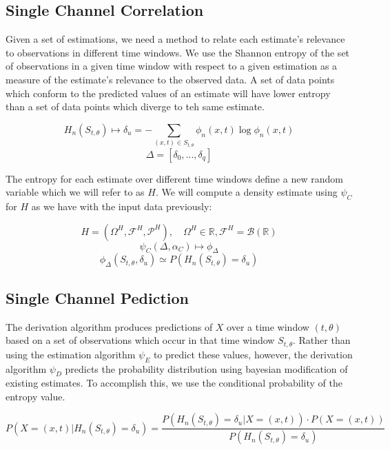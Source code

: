 \documentclass[10pt]{article}
\begin{document}
\subsection{Single Channel Correlation}

Given a set of estimations, we need a method to relate each estimate's relevance to observations in different time windows.  We use the Shannon entropy of the set of observations in a given time window with respect to a given estimation as a measure of the estimate's relevance to the observed data.  A set of data points which conform to the predicted values of an estimate will have lower entropy than a set of data points which diverge to teh same estimate.

\begin{equation} H_n( S_{t,\theta} ) \mapsto \delta_u = -\sum_{(x,t) \in S_{t,\theta}} \phi_n(x,t) \log \phi_n(x,t) \end{equation}
\[ \Delta = [\delta_0,...,\delta_q] \]

The entropy for each estimate over different time windows define a new random variable which we will refer to as \( H \).  We will compute a density estimate using \(\psi_C \) for \( H \) as we have with the input data previously:

\[ H = ( \Omega^H, \mathcal{F}^H, \mathcal{P}^H ), \quad \Omega^H \in \mathbb{R}, \mathcal{F}^H = \mathcal{B}(\mathbb{R}) \]
\begin{equation} \psi_C( \Delta , \alpha_C ) \mapsto \phi_\Delta \end{equation}
\begin{equation} \phi_\Delta(S_{t,\theta},\delta_u) \simeq P \left( H_n(S_{t,\theta}) = \delta_u \right)
\end{equation}

\subsection{Single Channel Pediction}
The derivation algorithm produces predictions of \(X \) over a time window \( (t,\theta) \) based on a set of observations which occur in that time window \(S_{t,\theta} \).  Rather than using the estimation algorithm \(\psi_E \) to predict these values, however, the derivation algorithm \(\psi_D \) predicts the probability distribution  using bayesian modification of existing estimates.  To accomplish this, we use the conditional probability of the entropy value.

\[ P \left( X = (x,t) | H_n(S_{t,\theta}) = \delta_u \right) = \frac { P \left( H_n( S_{t,\theta} ) = \delta_u | X = (x,t) \right) \cdot P \left( X = (x,t) \right) } { P \left( H_n( S_{t,\theta} ) = \delta_u \right) } \]
\end{document}
